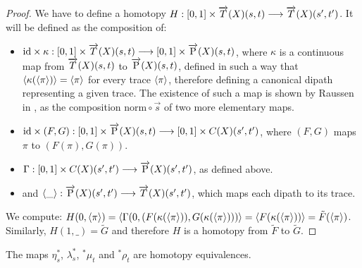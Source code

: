 \begin{proof}
  We have to define a homotopy
  $H : [0,1]\times\overrightarrow{T}(X)(s,t) \longrightarrow \overrightarrow{T}(X)(s',t')$. It will be
  defined as the composition of:
  \begin{itemize}
  \item $\text{id}\times \kappa : [0,1]\times\overrightarrow{T}(X)(s,t) \longrightarrow [0,1]\times
      \overrightarrow{\text{P}}(X)(s,t)$, where $\kappa$ is a continuous map from $\overrightarrow{T}(X)(s,t)$ to $\overrightarrow{\text{P}}(X)(s,t)$, defined in such a way that $\langle\kappa(\langle\pi\rangle)\rangle = \langle\pi\rangle$ for every
    trace $\langle\pi\rangle$, therefore defining a canonical dipath
    representing a given trace.  The existence of such a map is shown
    by Raussen in \cite{raussen09}, as the composition
    $\text{norm}\circ\overrightarrow{s}$ of two more elementary maps.
  \item $\text{id}\times(F, G) : [0,1]\times \overrightarrow{\text{P}}(X)(s,t) \longrightarrow [0,1]\times C(X)(s',t')$,
    where $(F, G)$ maps $\pi$ to $(F (\pi), G (\pi))$.
  \item $\Gamma : [0,1]\times C(X)(s',t') \longrightarrow \overrightarrow{\text{P}}(X)(s',t')$, as defined above.
  \item and $\langle\_\rangle : \overrightarrow{\text{P}}(X)(s',t') \longrightarrow \overrightarrow{T}(X)(s',t')$,
    which maps each dipath to its trace.
  \end{itemize}
  We compute: $H(0,\langle\pi\rangle) = \langle\Gamma (0, (F
  (\kappa (\langle\pi\rangle)), G (\kappa (\langle\pi\rangle)))\rangle = \langle F(\kappa (\langle\pi\rangle)) \rangle =
  \tilde{F}(\langle\pi\rangle)$.  Similarly, $H(1,\_) = \tilde{G}$
  and therefore $H$ is a homotopy from $\tilde{F}$ to $\tilde{G}$.
\end{proof}

\begin{lemme}
\label{lem:tech2}
  The maps $\eta_s^*$, $\lambda_s^*$, ${^*\mu_t}$ and ${^*\rho_t}$ are homotopy equivalences.
\end{lemme}

